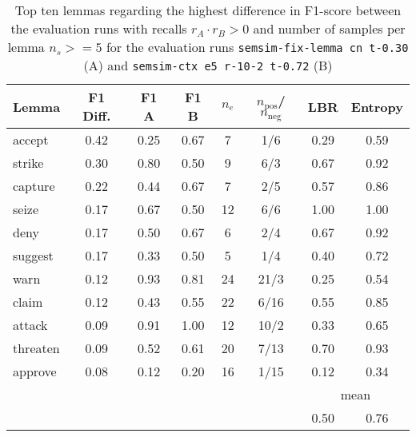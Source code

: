 \documentclass[11pt]{scrreprt}
\begin{document}
\begin{table}[p]
\centering
\begin{tabular}{lccccccc}
\toprule
Lemma      & F1 Diff. & F1 A & F1 B & \(n_e\) & \(n_\text{pos}\)/\(n_\text{neg}\) & LBR & Entropy \\
\midrule
accept     & 0.42      & 0.25           & 0.67           & 7               & 1/6     & 0.29 & 0.59 \\
strike     & 0.30      & 0.80           & 0.50           & 9               & 6/3     & 0.67 & 0.92 \\
capture    & 0.22      & 0.44           & 0.67           & 7               & 2/5     & 0.57 & 0.86 \\
seize      & 0.17      & 0.67           & 0.50           & 12              & 6/6     & 1.00 & 1.00 \\
deny       & 0.17      & 0.50           & 0.67           & 6               & 2/4     & 0.67 & 0.92 \\
suggest    & 0.17      & 0.33           & 0.50           & 5               & 1/4     & 0.40 & 0.72 \\
warn       & 0.12      & 0.93           & 0.81           & 24              & 21/3    & 0.25 & 0.54 \\
claim      & 0.12      & 0.43           & 0.55           & 22              & 6/16    & 0.55 & 0.85 \\
attack     & 0.09      & 0.91           & 1.00           & 12              & 10/2    & 0.33 & 0.65 \\
threaten   & 0.09      & 0.52           & 0.61           & 20              & 7/13    & 0.70 & 0.93 \\
approve    & 0.08      & 0.12           & 0.20           & 16              & 1/15    & 0.12 & 0.34 \\
\cmidrule{7-8}
\multicolumn{6}{l}{} & \multicolumn{2}{c}{mean} \\
\multicolumn{6}{l}{} & 0.50 & 0.76 \\
\bottomrule
\end{tabular}
\caption{Top ten lemmas regarding the highest difference in F1-score between the evaluation runs with recalls \(r_A \cdot r_B > 0\) and number of samples per lemma \(n_s >= 5\) for the evaluation runs \texttt{semsim-fix-lemma cn t-0.30} (A) and \texttt{semsim-ctx e5 r-10-2 t-0.72} (B)}
\label{tab:predicate-lemma-highest-f1-both-recall-non-zero}
\end{table}
\end{document}

